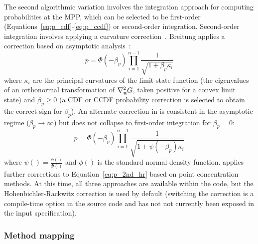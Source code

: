 The second algorithmic variation involves the integration approach for
computing probabilities at the MPP, which can be selected to be
first-order (Equations~\ref{eq:p_cdf}-\ref{eq:p_ccdf}) or second-order
integration.  Second-order integration involves applying a curvature
correction~\cite{Bre84,Hoh88,Hon99}.  Breitung applies a correction
based on asymptotic analysis~\cite{Bre84}:
\begin{equation}
p = \Phi(-\beta_p) \prod_{i=1}^{n-1} \frac{1}{\sqrt{1 + \beta_p \kappa_i}}
\label{eq:p_2nd_breit}
\end{equation}
where $\kappa_i$ are the principal curvatures of the limit state
function (the eigenvalues of an orthonormal transformation of
$\nabla^2_{\bf u} G$, taken positive for a convex limit state) and
$\beta_p \ge 0$ (a CDF or CCDF probability correction is selected to
obtain the correct sign for $\beta_p$).  An alternate correction in
\cite{Hoh88} is consistent in the asymptotic regime ($\beta_p \to \infty$) 
but does not collapse to first-order integration for $\beta_p = 0$:
\begin{equation}
p = \Phi(-\beta_p) \prod_{i=1}^{n-1} 
\frac{1}{\sqrt{1 + \psi(-\beta_p) \kappa_i}} \label{eq:p_2nd_hr}
\end{equation}
where $\psi() = \frac{\phi()}{\Phi()}$ and $\phi()$ is the standard
normal density function.  \cite{Hon99} applies further corrections to
Equation~\ref{eq:p_2nd_hr} based on point concentration methods.  At
this time, all three approaches are available within the code, but the
Hohenbichler-Rackwitz correction is used by default (switching the 
correction is a compile-time option in the source code and has not
not currently been exposed in the input specification).

\subsubsection{Method mapping} \label{uq:reliability:mpp:map}

